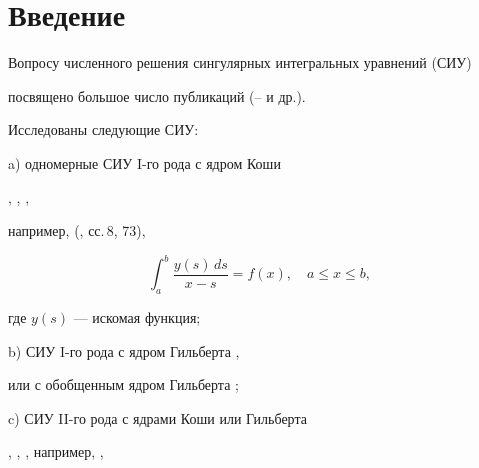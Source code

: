 \date{}




\pagestyle{plain} %







\maketitle


\label{begin}








\section{Введение}





Вопросу численного решения сингулярных интегральных уравнений (СИУ)


посвящено большое число публикаций (\cite{iv1}--\cite{ra} и др.).


Исследованы следующие СИУ:





\noindent{}a) одномерные СИУ I-го рода с ядром Коши


\cite{bl}, \cite{gab}, \cite{mus},


например, (\cite{bl}, сс.\,8, 73),


\begin{equation}


\label{eq1}


\int_a^b \frac{y(s)\,ds}{x-s}=f(x), \quad a\le x\le b,


\end{equation}


где $y(s)$ --- искомая функция;





\noindent{}b) СИУ I-го рода с ядром Гильберта \cite{bl}, \cite{gab}


или с обобщенным ядром Гильберта \cite{gab};





\noindent{}c) СИУ II-го рода с ядрами Коши или Гильберта


\cite{iv1}, \cite{bk}, \cite{mus}, например, \cite{bk},


